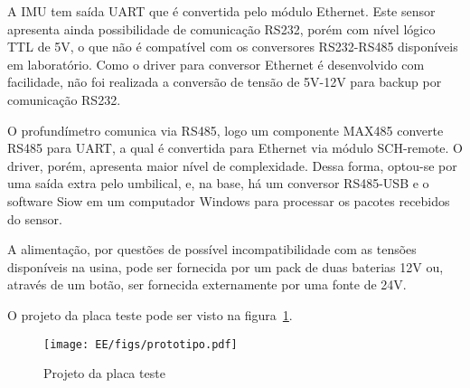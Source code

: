 A IMU tem saída UART que é convertida pelo módulo Ethernet. Este sensor
apresenta ainda possibilidade de comunicação RS232, porém com nível lógico TTL
de 5V, o que não é compatível com os conversores RS232-RS485 disponíveis em
laboratório. Como o driver para conversor Ethernet é desenvolvido com
facilidade, não foi realizada a conversão de tensão de 5V-12V para
backup por comunicação RS232.

O profundímetro comunica via RS485, logo um componente MAX485 converte RS485
para UART, a qual é convertida para Ethernet via módulo SCH-remote. O driver,
porém, apresenta maior nível de complexidade. Dessa forma, optou-se por uma
saída extra pelo umbilical, e, na base, há um conversor RS485-USB e o
software Siow em um computador Windows para processar os pacotes recebidos do
sensor.

A alimentação, por questões de possível incompatibilidade com as tensões
disponíveis na usina, pode ser fornecida por um pack de duas baterias 12V ou,
através de um botão, ser fornecida externamente por uma fonte de 24V.

O projeto da placa teste pode ser visto na figura~\ref{fig:prototipo}.

\begin{figure}[H]
 \centering
 \texttt{[image: EE/figs/prototipo.pdf]}
 \caption{Projeto da placa teste}
 \label{fig:prototipo}
 \end{figure}

